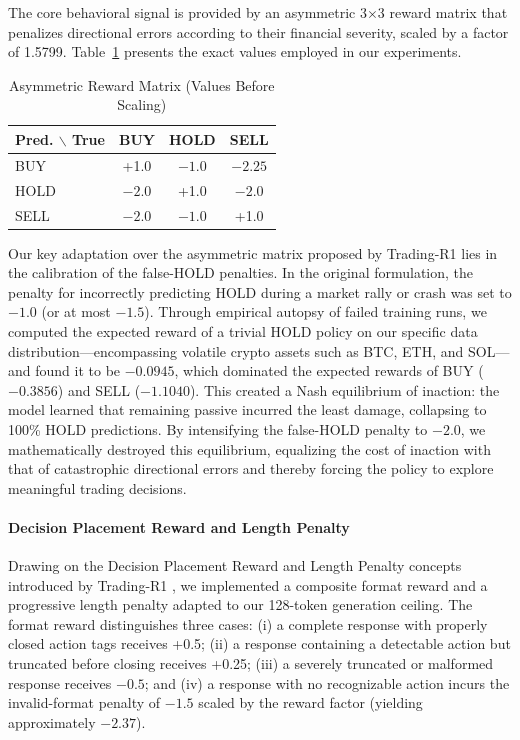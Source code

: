     The core behavioral signal is provided by an asymmetric 3$\times$3 reward matrix that penalizes directional errors according to their financial severity, scaled by a factor of 1.5799. Table~\ref{tab:reward_matrix} presents the exact values employed in our experiments.

    \begin{table}[htbp]
    \centering
    \caption{Asymmetric Reward Matrix (Values Before Scaling)}
    \label{tab:reward_matrix}
    \begin{tabular}{l|ccc}
    \hline
    \textbf{Pred. $\backslash$ True} & \textbf{BUY} & \textbf{HOLD} & \textbf{SELL} \\
    \hline
    BUY & +1.0 & $-1.0$ & $-2.25$ \\
    HOLD & $\mathbf{-2.0}$ & +1.0 & $\mathbf{-2.0}$ \\
    SELL & $-2.0$ & $-1.0$ & +1.0 \\
    \hline
    \end{tabular}
    \end{table}

    Our key adaptation over the asymmetric matrix proposed by Trading-R1 \cite{xiao2025tradingr1} lies in the calibration of the false-HOLD penalties. In the original formulation, the penalty for incorrectly predicting HOLD during a market rally or crash was set to $-1.0$ (or at most $-1.5$). Through empirical autopsy of failed training runs, we computed the expected reward of a trivial HOLD policy on our specific data distribution---encompassing volatile crypto assets such as BTC, ETH, and SOL---and found it to be $-0.0945$, which dominated the expected rewards of BUY ($-0.3856$) and SELL ($-1.1040$). This created a Nash equilibrium of inaction: the model learned that remaining passive incurred the least damage, collapsing to 100\% HOLD predictions. By intensifying the false-HOLD penalty to $-2.0$, we mathematically destroyed this equilibrium, equalizing the cost of inaction with that of catastrophic directional errors and thereby forcing the policy to explore meaningful trading decisions.

    \paragraph{Decision Placement Reward and Length Penalty}

    Drawing on the Decision Placement Reward and Length Penalty concepts introduced by Trading-R1 \cite{xiao2025tradingr1}, we implemented a composite format reward and a progressive length penalty adapted to our 128-token generation ceiling. The format reward distinguishes three cases: (i) a complete response with properly closed action tags receives +0.5; (ii) a response containing a detectable action but truncated before closing receives +0.25; (iii) a severely truncated or malformed response receives $-0.5$; and (iv) a response with no recognizable action incurs the invalid-format penalty of $-1.5$ scaled by the reward factor (yielding approximately $-2.37$).

